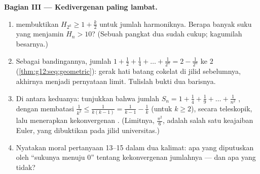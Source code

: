 \begin{problem}
\medskip
\noindent\textbf{Bagian III --- Kedivergenan paling lambat.}
\begin{enumerate}[resume]
  \item {} membuktikan
        $H_{2^k} \geq 1 + \frac k2$ untuk jumlah harmoniknya. Berapa
        banyak suku yang menjamin $H_n > 10$? (Sebuah pangkat dua sudah
        cukup; kagumilah besarnya.)
  \item Sebagai bandingannya, jumlah 
        $1 + \frac12 + \frac14 + \dots + \frac{1}{2^n} =
        2 - \frac{1}{2^n}$  ke $2$
        (\cref{thm:g12:seq:geometric}): gerak hati batang cokelat
        di jilid sebelumnya, akhirnya menjadi pernyataan limit.
        Tulislah bukti dua barisnya.
  \item Di antara keduanya: tunjukkan bahwa jumlah
        $S_n = 1 + \frac{1}{4} + \frac{1}{9} + \dots +
        \frac{1}{n^2}$ , dengan membatasi
        $\frac{1}{k^2} \leq \frac{1}{k(k-1)} =
        \frac{1}{k-1} - \frac{1}{k}$ (untuk $k \geq 2$),
        secara teleskopik, lalu menerapkan kekonvergenan . (Limitnya,
        $\frac{\pi^2}{6}$, adalah salah satu keajaiban Euler,
        yang dibuktikan pada jilid universitas.)
  \item Nyatakan moral pertanyaan 13--15 dalam dua kalimat:
        apa yang diputuskan oleh ``sukunya menuju $0$'' tentang
        kekonvergenan jumlahnya --- dan apa yang tidak?
\end{enumerate}


\end{problem}
